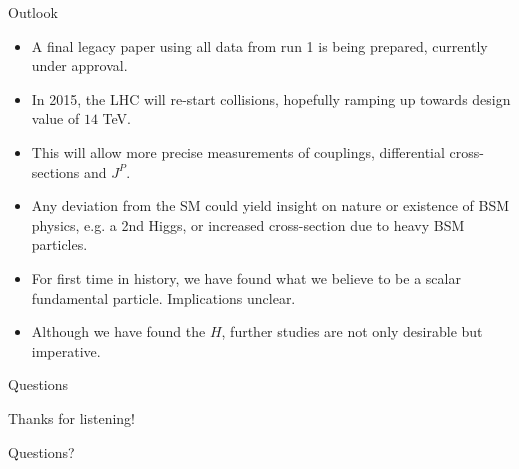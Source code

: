 \documentclass{beamer}
\begin{document}
\begin{frame}{Outlook}

  \begin{itemize}
  \vfill \item A final legacy paper using all data from run 1 is being prepared, currently under approval.
 \pause \vfill \item In 2015, the LHC will re-start collisions, hopefully ramping up towards design value of $14$ TeV.
\pause  \vfill \item This will allow more precise measurements of couplings, differential cross-sections and $J^P$.
\pause  \vfill \item Any deviation from the SM could yield insight on nature or existence of BSM physics, e.g. a 2nd Higgs, or increased cross-section due to heavy BSM particles.
\pause  \vfill \item For first time in history, we have found what we believe to be a scalar fundamental particle. Implications unclear.
 \pause \vfill \item Although we have found the $H$, further studies are not only desirable but imperative.
 
  \end{itemize}
 
\end{frame}
\begin{frame}{Questions}
\begin{center}
{\Large Thanks for listening! 

Questions?}
\end{center}
\end{frame}
\end{document}
